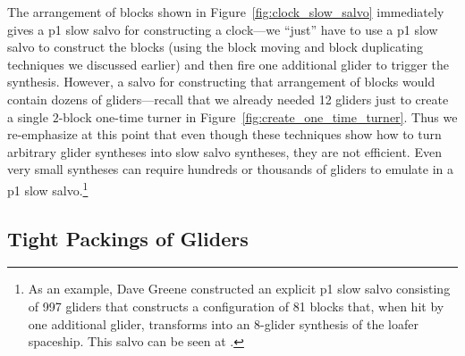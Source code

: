 The arrangement of blocks shown in Figure~\ref{fig:clock_slow_salvo} immediately gives a p1 slow salvo for constructing a clock---we ``just'' have to use a p1 slow salvo to construct the blocks (using the block moving and block duplicating techniques we discussed earlier) and then fire one additional glider to trigger the synthesis. However, a salvo for constructing that arrangement of blocks would contain dozens of gliders---recall that we already needed 12 gliders just to create a single $2$-block one-time turner in Figure~\ref{fig:create_one_time_turner}. Thus we re-emphasize at this point that even though these techniques show how to turn arbitrary glider syntheses into slow salvo syntheses, they are not efficient. Even very small syntheses can require hundreds or thousands of gliders to emulate in a p1 slow salvo.\footnote{As an example, Dave Greene constructed an explicit p1 slow salvo consisting of 997 gliders that constructs a configuration of 81 blocks that, when hit by one additional glider, transforms into an 8-glider synthesis of the loafer spaceship. This salvo can be seen at .}


\subsection{Tight Packings of Gliders}\label{sec:slow_salvo_tight}

